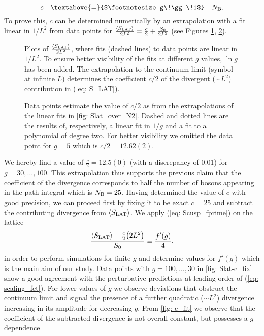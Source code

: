 %
%
\begin{equation}
c\quad \textabove{=}{$\footnotesize g\!\gg\!1$} \quad N_{\rm B}.
\end{equation}
%
%
To prove this, $c$ can be determined numerically by an extrapolation with a fit linear in $1/L^{2}$ from data points for $\frac{\langle S_{\rm LAT}\rangle}{2L^{2}} = \frac{c}{2}+ \frac{S_{0}}{2L^{2}}$ (see Figures \ref{fig: Slat_over_N2}, \ref{fig: c_fit}).
%
%
\begin{figure}[ht!]
\centering

\caption{Plots of $\frac{\langle S_{\rm LAT}\rangle}{2L^{2}}$, where fits (dashed lines) to data points are linear in $1/L^{2}$. To ensure better visibility of the fits at different $g$ values, $\ln g$ has been added. The extrapolation to the continuum limit (symbol at infinite $L$) determines the coefficient $c/2$ of the divergent ($\sim L^{2}$) contribution in (\ref{eq: S_LAT}).
\label{fig: Slat_over_N2}}
\end{figure}
%
%
\begin{figure}[ht!]
\centering

\caption{Data points estimate the value of $c/2$ as from the extrapolations of the linear fits in \autoref{fig: Slat_over_N2}. Dashed and dotted lines are the results of, respectively, a linear fit in $1/g$ and a fit to a polynomial of degree two. For better visibility we omitted the data point for $g=5$ which is $c/2=12.62(2)$.
\label{fig: c_fit}}
\end{figure}
%
%
We hereby find a value of $\frac{c}{2}=12.5(0)$ (with a discrepancy of $0.01$) for $g=30,\ldots,100$. This extrapolation thus supports the previous claim that the coefficient of the divergence corresponds to half the number of bosons appearing in the path integral which is $N_{\rm B}=25$. Having determined the value of $c$ with good precision, we can proceed first by fixing it to be exact $c=25$ and subtract the contributing divergence from $\langle S_{\rm LAT} \rangle$. We apply (\ref{eq: Scusp_fprime}) on the lattice
%
%
\begin{equation}
\frac{\langle S_{\rm LAT}\rangle -\frac{c}{2}\big(2L^{2}\big)}{S_{0}} \equiv \frac{f'(g)}{4},
\label{eq: Slat_fprime}
\end{equation}
%
%
in order to perform simulations for finite $g$ and determine values for $f'(g)$ which is the main aim of our study. Data points with $g=100,\ldots,30$ in \autoref{fig: Slat-c_fix} show a good agreement with the perturbative predictions at leading order of (\ref{eq: scaling_fct}). For lower values of $g$ we observe deviations that obstruct the continuum limit and signal the presence of a further quadratic ($\sim L^{2}$) divergence increasing in its amplitude for decreasing $g$. From \autoref{fig: c_fit} we observe that the coefficient of the subtracted divergence is not overall constant, but possesses a $g$ dependence

